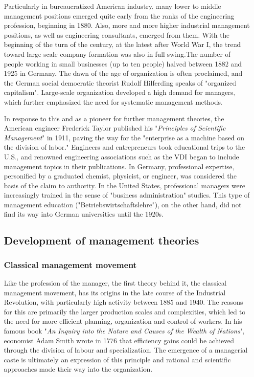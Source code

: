 \documentclass[a4paper,12pt]{scrartcl}
\begin{document}
Particularly in bureaucratized American industry, many lower to middle management positions emerged quite early from the ranks of the engineering profession, beginning in 1880. Also, more and more higher industrial management positions, as well as engineering consultants, emerged from them.\cite{gispen:2006}
With the beginning of the turn of the century, at the latest after World War I, the trend toward large-scale company formation was also in full swing.The number of people working in small businesses (up to ten people) halved between 1882 and 1925 in Germany. The dawn of the age of organization is often proclaimed, and the German social democratic theorist Rudolf Hilferding speaks of "organized capitalism".  Large-scale organization developed a high demand for managers, which further emphasized the need for systematic management methods.\cite{gispen:2006}

In response to this and as a pioneer for further management theories, the American engineer Frederick Taylor published his "\textit{Principles of Scientific Management}" in 1911, paving the way for the "enterprise as a machine based on the division of labor."\cite{oelsnitz:2009} Engineers and entrepreneurs took educational trips to the U.S., and renowned engineering associations such as the VDI began to include management topics in their publications.\cite{kocka:1999} In Germany, professional expertise, personified by a graduated chemist, physicist, or engineer, was considered the basis of the claim to authority. In the United States, professional managers were increasingly trained in the sense of "business administration" studies. This type of management education ("Betriebswirtschaftslehre"), on the other hand, did not find its way into German universities until the 1920s.\cite{kocka:1999}

\subsection{Development of management theories}

\subsubsection{Classical management movement}
Like the profession of the manager, the first theory behind it, the classical management movement, has its origins in the late course of the Industrial Revolution, with particularly high activity between 1885 and 1940. The reasons for this are primarily the larger production scales and complexities, which led to the need for more efficient planning, organization and control of workers.\cite{pindur:1995} In his famous book "\textit{An Inquiry into the Nature and Causes of the Wealth of Nations}", economist Adam Smith wrote in 1776 that efficiency gains could be achieved through the division of labour and specialization.\cite{smith:2008} The emergence of a managerial caste is ultimately an expression of this principle and rational and scientific approaches made their way into the organization.
\end{document}
